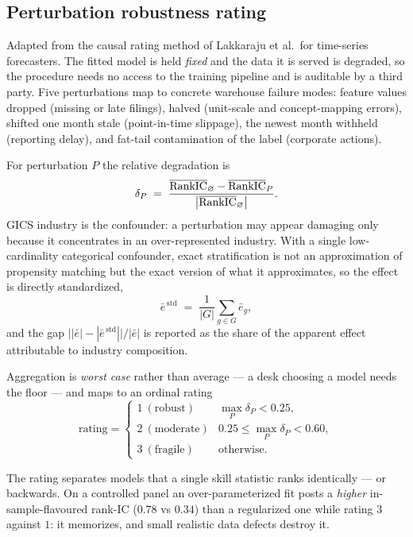 \documentclass[11pt]{article}
\begin{document}
\subsection{Perturbation robustness rating}
Adapted from the causal rating method of Lakkaraju et al.\ for time-series
forecasters. The fitted model is held \emph{fixed} and the data it is served is
degraded, so the procedure needs no access to the training pipeline and is auditable
by a third party. Five perturbations map to concrete warehouse failure modes: feature
values dropped (missing or late filings), halved (unit-scale and concept-mapping
errors), shifted one month stale (point-in-time slippage), the newest month withheld
(reporting delay), and fat-tail contamination of the label (corporate actions).

For perturbation $P$ the relative degradation is
\begin{equation}
  \delta_P \;=\; \frac{\overline{\mathrm{RankIC}}_{\varnothing}-\overline{\mathrm{RankIC}}_{P}}
                      {\big|\overline{\mathrm{RankIC}}_{\varnothing}\big|}.
\end{equation}
GICS industry is the confounder: a perturbation may appear damaging only because it
concentrates in an over-represented industry. With a single low-cardinality
categorical confounder, exact stratification is not an approximation of propensity
matching but the exact version of what it approximates, so the effect is directly
standardized,
\begin{equation}
  \bar e^{\,\text{std}} \;=\; \frac{1}{|G|}\sum_{g\in G} \bar e_g ,
\end{equation}
and the gap $\big||\bar e|-|\bar e^{\,\text{std}}|\big|/|\bar e|$ is reported as the
share of the apparent effect attributable to industry composition.

Aggregation is \emph{worst case} rather than average --- a desk choosing a model needs
the floor --- and maps to an ordinal rating
\begin{equation}
  \text{rating} =
  \begin{cases}
    1\ (\text{robust})   & \max_P \delta_P < 0.25,\\
    2\ (\text{moderate}) & 0.25 \le \max_P \delta_P < 0.60,\\
    3\ (\text{fragile})  & \text{otherwise.}
  \end{cases}
\end{equation}

\begin{keybox}
The rating separates models that a single skill statistic ranks identically --- or
backwards. On a controlled panel an over-parameterized fit posts a \emph{higher}
in-sample-flavoured rank-IC ($0.78$ vs $0.34$) than a regularized one while rating
$3$ against $1$: it memorizes, and small realistic data defects destroy it.
\end{keybox}
\end{document}
